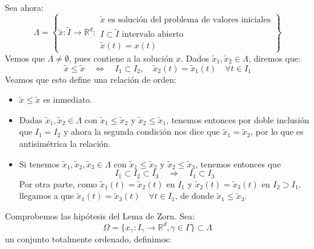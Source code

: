 \begin{ejercicio}
    \noindent
    Sea ahora:
    \begin{equation*}
        \Lambda = \left\{\tilde{x}:\tilde{I}\to \mathbb{R}^d :
            \begin{array}{l}
                \tilde{x} \text{\ es solución del problema de valores iniciales} \\
                I\subset \tilde{I} \text{\ intervalo abierto} \\
                \tilde{x}(t) = x(t)
            \end{array}
        \right\}
    \end{equation*}
    Vemos que $\Lambda\neq \emptyset $, pues contiene a la solución $x$. Dados $\tilde{x}_1,\tilde{x}_2\in \Lambda$, diremos que:
    \begin{equation*}
        \tilde{x} \leq \tilde{x} \quad\Longleftrightarrow\quad I_1\subset I_2, \quad \tilde{x}_2(t) = \tilde{x}_1(t) \quad \forall t\in I_1
    \end{equation*}
    Veamos que esto define una relación de orden:
    \begin{itemize}
        \item $\tilde{x}\leq \tilde{x}$ es inmediato.
        \item Dadas $\tilde{x}_1,\tilde{x}_2\in \Lambda$ con $\tilde{x}_1\leq \tilde{x}_2$ y $\tilde{x}_2\leq \tilde{x}_1$, tenemos entonces por doble inclusión que $I_1 = I_2$ y ahora la segunda condición nos dice que $\tilde{x}_1 = \tilde{x}_2$, por lo que es antisimétrica la relación.
        \item Si tenemos $\tilde{x}_1,\tilde{x}_2,\tilde{x}_3\in \Lambda$ con $\tilde{x}_1\leq \tilde{x}_2$ y $\tilde{x}_2\leq \tilde{x}_3$, tenemos entonces que
            \begin{equation*}
                I_1\subset I_2 \subset I_3 \quad\Longrightarrow\quad I_1\subset I_3
            \end{equation*}
            Por otra parte, como $\tilde{x}_1(t) = \tilde{x}_2(t)$ en $I_1$ y $\tilde{x}_2(t)= \tilde{x}_3(t)$ en $I_2\supset I_1$, llegamos a que $\tilde{x}_1(t) = \tilde{x}_3(t)\quad \forall t\in I_1$, de donde $\tilde{x}_1\leq \tilde{x}_3$.
    \end{itemize}
    Comprobemos las hipótesis del Lema de Zorn. Sea:
    \begin{equation*}
        \Omega = \{x_\gamma : I_\gamma\to \mathbb{R}^d, \gamma\in \Gamma\} \subset \Lambda
    \end{equation*}
    un conjunto totalmente ordenado, definimos:
    \begin{equation*}

\end{equation*}
\end{ejercicio}
